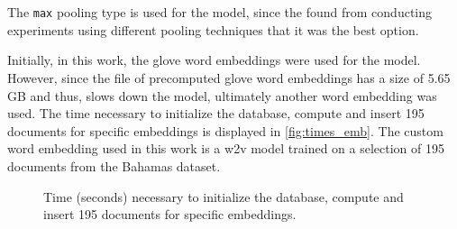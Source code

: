 \section{\infersent{}}\label{sec:evaluation-inferSent}

The \texttt{max} pooling type is used for the \infersent{} model, since the \citeauthor{inferSent2018} 
found from conducting experiments using different pooling techniques
that it was the best option.

Initially, in this work, the \ac{glove} word embeddings were used for the \infersent{} model.
However, since the file of precomputed \acs{glove} word embeddings has a size of 5.65 GB and thus,
slows down the model, ultimately another word embedding was used.
The time necessary to initialize the database, compute and insert 195 documents for specific embeddings is displayed in \autoref{fig:times_emb}.
The custom word embedding used in this work is a \ac{w2v} model trained on a selection of 195 documents from the Bahamas dataset.

\begin{figure}%
    \centering
    \qquad
    \caption{Time (seconds) necessary to initialize the database, compute and insert 195 documents for specific embeddings.}%
    \label{fig:times_emb}%
\end{figure}
